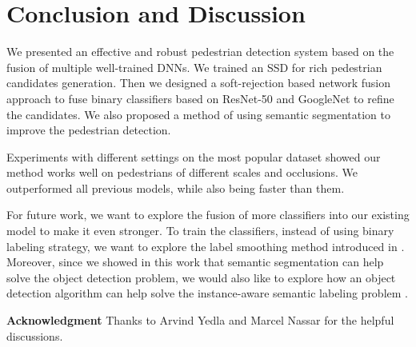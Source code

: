 \documentclass[10pt,letterpaper]{article}
\begin{document}
\section{Conclusion and Discussion}
We presented an effective and robust pedestrian detection system based on the fusion of multiple well-trained DNNs. We trained an SSD for rich pedestrian candidates generation. Then we designed a soft-rejection based network fusion approach to fuse binary classifiers based on ResNet-50 and GoogleNet to refine the candidates. We also proposed a method of using semantic segmentation to improve the pedestrian detection.

Experiments with different settings on the most popular dataset showed our method works well on pedestrians of different scales and occlusions. We outperformed all previous models, while also being faster than them.  

For future work, we want to explore the fusion of more classifiers into our existing model to make it even stronger. To train the classifiers, instead of using binary labeling strategy, we want to explore the label smoothing method introduced in \cite{inceptionV3}. Moreover, since we showed in this work that semantic segmentation can help solve the object detection problem, we would also like to explore how an object detection algorithm can help solve the instance-aware semantic labeling problem \cite{uhrig2016pixel}. 

\vspace{2\baselineskip}
\textbf{Acknowledgment} Thanks to Arvind Yedla and Marcel Nassar for the helpful discussions.
\vspace{1.5\baselineskip}

{


}
\end{document}
